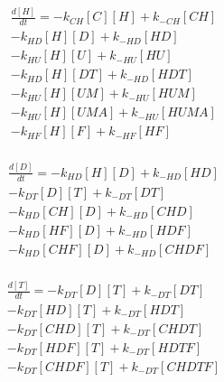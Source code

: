 \begin{equation}
\begin{split}
\frac{d[H]}{dt} =     - k_{CH}[C][H]    + k_{-CH}[CH]     \\%
                      - k_{HD}[H][D]    + k_{-HD}[HD]     \\%
                      - k_{HU}[H][U]    + k_{-HU}[HU]     \\%
                      - k_{HD}[H][DT]   + k_{-HD}[HDT]    \\%
                      - k_{HU}[H][UM]   + k_{-HU}[HUM]    \\%
                      - k_{HU}[H][UMA]  + k_{-HU}[HUMA]   \\%
                      - k_{HF}[H][F]  + k_{-HF}[HF]       \\%
\end{split}
\end{equation}


\begin{equation}
\begin{split}
\frac{d[D]}{dt} =     - k_{HD}[H][D]    + k_{-HD}[HD]     \\%
                      - k_{DT}[D][T]    + k_{-DT}[DT]     \\%
                      - k_{HD}[CH][D]   + k_{-HD}[CHD]    \\%
                      - k_{HD}[HF][D]   + k_{-HD}[HDF]    \\%
                      - k_{HD}[CHF][D]   + k_{-HD}[CHDF]  \\%
\end{split}
\end{equation}


\begin{equation}
\begin{split}
\frac{d[T]}{dt} =     - k_{DT}[D][T]    + k_{-DT}[DT]     \\%
                      - k_{DT}[HD][T]   + k_{-DT}[HDT]    \\%
                      - k_{DT}[CHD][T]  + k_{-DT}[CHDT]   \\%
                      - k_{DT}[HDF][T]  + k_{-DT}[HDTF]   \\%
                      - k_{DT}[CHDF][T]  + k_{-DT}[CHDTF] \\%
\end{split}
\end{equation}

